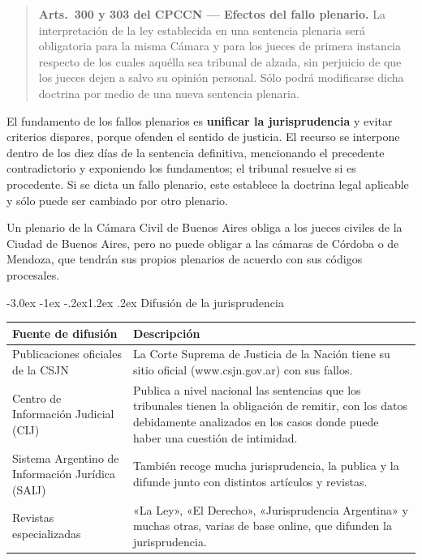 \documentclass[12pt,oneside]{book}
\makeatletter
\renewcommand\section{\@startsection{section}{1}{\z@}%
  {-3.0ex \@plus -1ex \@minus -.2ex}{1.2ex \@plus .2ex}%
  {\normalfont\large\bfseries\color{acento}}}
\makeatother
\begin{document}
\begin{quote}
\textbf{Arts.~300 y 303 del CPCCN --- Efectos del fallo plenario.} La interpretación de la ley establecida en una sentencia plenaria será obligatoria para la misma Cámara y para los jueces de primera instancia respecto de los cuales aquélla sea tribunal de alzada, sin perjuicio de que los jueces dejen a salvo su opinión personal. Sólo podrá modificarse dicha doctrina por medio de una nueva sentencia plenaria.
\end{quote}

El fundamento de los fallos plenarios es \textbf{unificar la jurisprudencia} y evitar criterios dispares, porque ofenden el sentido de justicia. El recurso se interpone dentro de los diez días de la sentencia definitiva, mencionando el precedente contradictorio y exponiendo los fundamentos; el tribunal resuelve si es procedente. Si se dicta un fallo plenario, este establece la doctrina legal aplicable y sólo puede ser cambiado por otro plenario.

\begin{importante}
Un plenario de la Cámara Civil de Buenos Aires obliga a los jueces civiles de la Ciudad de Buenos Aires, pero no puede obligar a las cámaras de Córdoba o de Mendoza, que tendrán sus propios plenarios de acuerdo con sus códigos procesales.
\end{importante}

\section{Difusión de la jurisprudencia}

\begin{table}[H]
\centering
\begin{tabularx}{\textwidth}{>{\raggedright\arraybackslash}p{} >{\raggedright\arraybackslash}X}
\toprule
\textbf{Fuente de difusión} & \textbf{Descripción} \\
\midrule
Publicaciones oficiales de la CSJN & La Corte Suprema de Justicia de la Nación tiene su sitio oficial (www.csjn.gov.ar) con sus fallos. \\
\addlinespace
Centro de Información Judicial (CIJ) & Publica a nivel nacional las sentencias que los tribunales tienen la obligación de remitir, con los datos debidamente analizados en los casos donde puede haber una cuestión de intimidad. \\
\addlinespace
Sistema Argentino de Información Jurídica (SAIJ) & También recoge mucha jurisprudencia, la publica y la difunde junto con distintos artículos y revistas. \\
\addlinespace
Revistas especializadas & «La Ley», «El Derecho», «Jurisprudencia Argentina» y muchas otras, varias de base online, que difunden la jurisprudencia. \\
\bottomrule
\end{tabularx}
\end{table}
\end{document}
